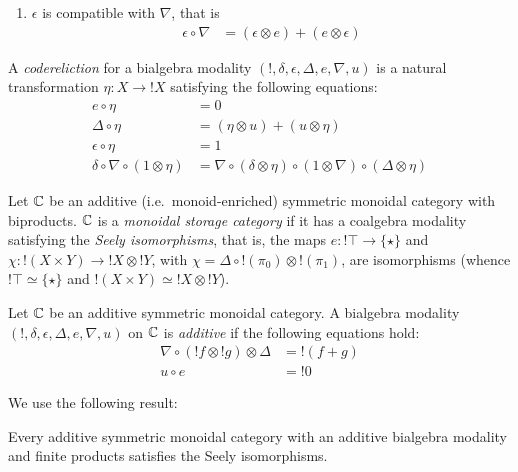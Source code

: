 \begin{definition}
\begin{enumerate}
\item $\epsilon$ is compatible with $\nabla$, that is
\begin{align}
 \epsilon \circ \nabla& =  (\epsilon\otimes e)+(e\otimes \epsilon)
\end{align}

\end{enumerate}

\end{definition}


\begin{definition}
A \emph{codereliction} for a bialgebra modality $(!,\delta,\epsilon,\Delta, e,\nabla,u)$ is a natural transformation $\eta:X\to !X$ satisfying the following equations:
\begin{align}
e\circ \eta & = 0\\
 \Delta\circ \eta&  = (\eta\otimes u)+(u\otimes \eta) \\
 \epsilon\circ \eta & = 1 \\
\delta \circ \nabla\circ(1\otimes \eta) & =  \nabla \circ 
 (\delta\otimes \eta) \circ  (1\otimes \nabla)\circ
(\Delta \otimes \eta)
\end{align}
\end{definition}


\begin{definition}
Let $\mathbb{C}$ be an additive (i.e.~monoid-enriched) symmetric monoidal category with biproducts.
 $\mathbb{C}$ is a \emph{monoidal storage category} if it has a coalgebra modality satisfying the \emph{Seely isomorphisms}, that is, the maps
 $e:!\top \to \{\star\}$ and $\chi:!(X\times Y) \to !X\otimes !Y$, with $\chi=\Delta \circ  !(\pi_{0})\otimes!(\pi_{1})$, are isomorphisms (whence $!\top\simeq \{\star\}$ and $!(X\times Y)\simeq !X\otimes !Y$).
\end{definition}


\begin{definition}
Let $\mathbb{C}$ be an additive symmetric monoidal category. A bialgebra modality $(!,\delta,\epsilon,\Delta,e,\nabla,u)$ on $\mathbb{C}$ is \emph{additive} if the following equations hold:
\begin{align}
\nabla\circ (!f\otimes !g)\otimes \Delta  & = !(f+g)\\ 
u\circ e & = !0
\end{align}
\end{definition}

We use the following result:
\begin{theorem}\label{theorem:lemay}
Every additive symmetric monoidal category with an additive bialgebra modality and finite products satisfies the Seely isomorphisms.
\end{theorem}


